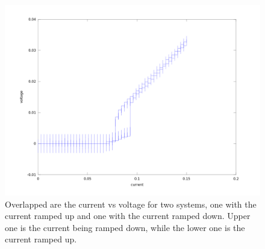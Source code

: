 \begin{figure}[htbp]
\begin{center}
\includegraphics[scale=.50]{JvV.png}
\caption{ Overlapped are the current vs voltage for two systems, one with the current ramped up and one with the current ramped down. Upper one is the current being ramped down, while the lower one is the current ramped up.}
\label{hysteresis}
\end{center}
\end{figure}


